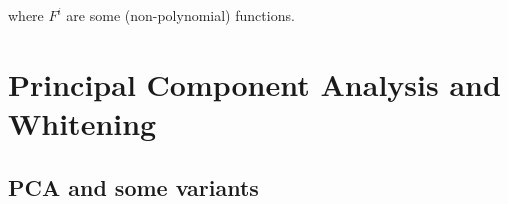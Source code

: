 \documentclass[a4paper]{book}
\begin{document}
\begin{itemize}
\begin{itemize}
	where $F^i$ are some (non-polynomial) functions.
	\end{itemize}

\end{itemize}








\chapter{Principal Component Analysis and Whitening}

\section{PCA and some variants}
\end{document}
